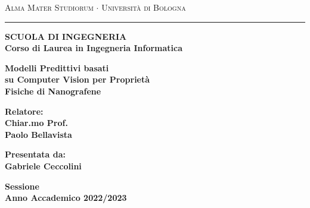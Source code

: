 \documentclass[12pt,a4paper,openright,twoside]{report}
\begin{document}
\begin{titlepage}  
\begin{center}
{{\Large{\textsc{Alma Mater Studiorum $\cdot$ Universit\`a di
Bologna}}}} 
\rule[0.1cm]{15.8cm}{0.1mm}
{\small{\bf SCUOLA DI INGEGNERIA\\
Corso di Laurea in Ingegneria Informatica }}
\end{center}
\vspace{15mm}
\begin{center}
{\LARGE{\bf Modelli Predittivi basati   }}\\
\vspace{3mm}
{\LARGE{\bf  su Computer Vision per Proprietà  }}\\
\vspace{3mm}
{\LARGE{\bf Fisiche di Nanografene }}\\
\end{center}
\vspace{30mm}
\par
\noindent
\begin{minipage}[t]{0.47\textwidth}
{\large{\bf Relatore:\\
Chiar.mo Prof.\\
Paolo Bellavista}}
\end{minipage}
\hfill
\begin{minipage}[t]{0.47\textwidth}\raggedleft
{\large{\bf Presentata da:\\
Gabriele Ceccolini}}
\end{minipage}
\vspace{20mm}
\begin{center}
{\large{\bf Sessione\\%
Anno Accademico 2022/2023 }}%
\end{center}
%
\thispagestyle{empty}                   %
\raggedleft                             %
\large                                  %
\newpage                                %
%
\clearpage{\pagestyle{empty}\cleardoublepage}%
\end{titlepage}
\end{document}
